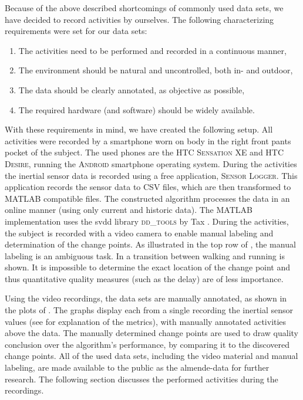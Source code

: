 Because of the above described shortcomings of commonly used data sets, we have decided to record activities by ourselves.
The following characterizing requirements were set for our data sets:
\begin{enumerate}
  \item The activities need to be performed and recorded in a continuous manner,
  \item The environment should be natural and uncontrolled, both in- and outdoor,
  \item The data should be clearly annotated, as objective as possible,
  \item The required hardware (and software) should be widely available.
\end{enumerate}

With these requirements in mind, we have created the following setup.
All activities were recorded by a smartphone worn on body in the right front pants pocket of the subject.
The used phones are the \textsc{HTC Sensation XE} and \textsc{HTC Desire}, running the \textsc{Android} smartphone operating system.
During the activities the inertial sensor data is recorded using a free application, \textsc{Sensor Logger}.
This application records the sensor data to \textsc{CSV} files, which are then transformed to \textsc{MATLAB} compatible files.
The constructed algorithm processes the data in an online manner (using only current and historic data).
The \textsc{MATLAB} implementation uses the \gls{svdd} library \textsc{dd\_tools} by Tax \cite{Ddtools2013}.
During the activities, the subject is recorded with a video camera to enable manual labeling and determination of the change points.
As illustrated in the top row of , the manual labeling is an ambiguous task.
In  a transition between walking and running is shown.
It is impossible to determine the exact location of the change point and thus quantitative quality measures (such as the delay) are of less importance.

Using the video recordings, the data sets are manually annotated, as shown in the plots of .
The graphs display each from a single recording the inertial sensor values (see  for explanation of the metrics), with manually annotated activities above the data.
The manually determined change points are used to draw quality conclusion over the algorithm's performance, by comparing it to the discovered change points.
All of the used data sets, including the video material and manual labeling, are made available to the public as the \acrlong{almende-data} \cite{vlasveld2014acras} for further research.
The following section discusses the performed activities during the recordings.
